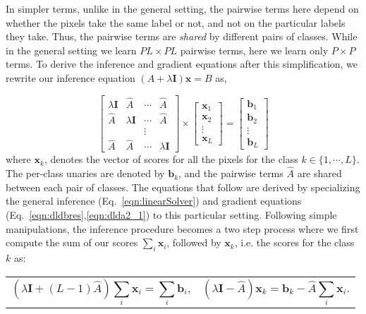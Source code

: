 \documentclass[runningheads]{llncs}
\begin{document}
In simpler terms, unlike in the general setting, the pairwise terms here depend on whether the pixels take the same label or not, and not on the particular labels they take.
Thus, the pairwise terms are \emph{shared} by different pairs of classes. 
While in the general setting we learn $PL \times PL$ pairwise terms, here we learn only $P\times P$ terms. To derive the inference and gradient equations after this simplification,
we rewrite our inference equation $\left(A+\lambda \textbf{I}\right) \textbf{x} = B$ as,

\begin{equation}
\begin{bmatrix} \lambda \textbf{I} & \hat{A} & \cdots & \hat{A} \\ \hat{A} & \lambda \textbf{I} & \cdots & \hat{A} \\ & & \vdots & \\ \hat{A} & \hat{A} & \cdots & \lambda \textbf{I} \end{bmatrix} \times 
\left[ \begin{array}{c} {\textbf{x}_1} \\ \textbf{x}_2 \\ \vdots \\ \textbf{x}_L \end{array} \right] =  
\left[ \begin{array}{c} \textbf{b}_1 \\ \textbf{b}_2 \\ \vdots \\ \textbf{b}_L \end{array} \right]
\label{eq:matrixform}
\end{equation}
where $\textbf{x}_k$, denotes the vector of scores for all the pixels for the class $k \in \{1,\cdots,L\}$. The per-class unaries are denoted by $\textbf{b}_k$, and the pairwise terms $\hat{A}$ are 
shared between each pair of classes. The equations that follow are derived by specializing the general inference (Eq.~\ref{eqn:linearSolver}) and gradient equations (Eq.~\ref{eqn:dldbres},\ref{eqn:dlda2_1}) to this particular setting.
Following simple manipulations, the inference procedure becomes a two step process where we first compute the sum of our 
scores $\sum_i \textbf{x}_i$, followed by $\textbf{x}_k$, i.e. the scores for the class $k$ as:

\noindent\begin{tabularx}{\textwidth}{@{}XX@{}}
\begin{equation}
\left(\lambda \textbf{I} + \left(L - 1\right)\hat{A}\right) \sum_{i} \textbf{x}_i = \sum_i \textbf{b}_i \text{,}
\label{eq:sumxk}
\end{equation} &
\begin{equation}
(\lambda \textbf{I}-\hat{A})\textbf{x}_k = \textbf{b}_k - \hat{A}\sum_i \textbf{x}_i \text{.}
\label{eq:xk}
\end{equation} 
\end{tabularx}
\end{document}
